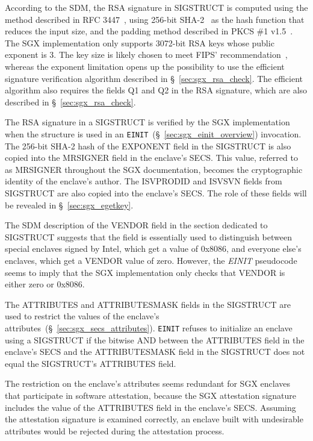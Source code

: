 According to the SDM, the RSA signature in SIGSTRUCT is computed using the
method described in RFC 3447~\cite{jonsson2003pkcsv21}, using 256-bit
SHA-2~\cite{fips2015shs} as the hash function that reduces the input size, and
the padding method described in PKCS \#1 v1.5~\cite{kaliski1998pkcs1v15}. The
SGX implementation only supports 3072-bit RSA keys whose public exponent is 3.
The key size is likely chosen to meet FIPS'
recommendation~\cite{fips2012keysize}, whereas the exponent limitation opens up
the possibility to use the efficient signature verification algorithm described
in \S~\ref{sec:sgx_rsa_check}. The efficient algorithm also requires the fields
Q1 and Q2 in the RSA signature, which are also described in
\S~\ref{sec:sgx_rsa_check}.


The RSA signature in a SIGSTRUCT is verified by the SGX implementation when the
structure is used in an \texttt{EINIT}~(\S~\ref{sec:sgx_einit_overview})
invocation. The 256-bit SHA-2 hash of the EXPONENT field in the SIGSTRUCT is
also copied into the MRSIGNER field in the enclave's SECS. This value, referred
to as MRSIGNER throughout the SGX documentation, becomes the cryptographic
identity of the enclave's author. The ISVPRODID and ISVSVN fields from
SIGSTRUCT are also copied into the enclave's SECS. The role of these fields
will be revealed in \S~\ref{sec:sgx_egetkey}.


The SDM description of the VENDOR field in the section dedicated to SIGSTRUCT
suggests that the field is essentially used to distinguish between special
enclaves signed by Intel, which get a value of 0x8086, and everyone else's
enclaves, which get a VENDOR value of zero. However, the \textit{EINIT}
pseudocode seems to imply that the SGX implementation only checks that
VENDOR is either zero or 0x8086.

The ATTRIBUTES and ATTRIBUTESMASK fields in the SIGSTRUCT are used to restrict
the values of the enclave's attributes~(\S~\ref{sec:sgx_secs_attributes}).
\texttt{EINIT} refuses to initialize an enclave using a SIGSTRUCT if the
bitwise AND between the ATTRIBUTES field in the enclave's SECS and the
ATTRIBUTESMASK field in the SIGSTRUCT does not equal the SIGSTRUCT's ATTRIBUTES
field.

The restriction on the enclave's attributes seems redundant for SGX enclaves
that participate in software attestation, because the SGX attestation signature
includes the value of the ATTRIBUTES field in the enclave's SECS. Assuming the
attestation signature is examined correctly, an enclave built with undesirable
attributes would be rejected during the attestation process.

